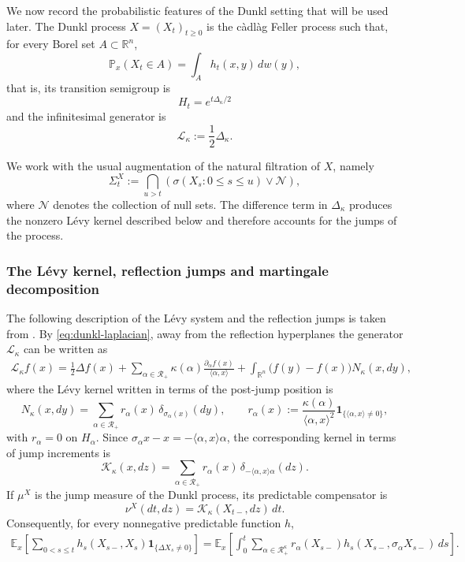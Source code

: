 \documentclass[11pt]{amsart}
\theoremstyle{definition}
\theoremstyle{remark}
\numberwithin{equation}{section}
\newcommand{\R}{\mathbb{R}}
\newcommand{\ind}{\mathbf{1}}
\newcommand{\RR}{\mathcal{R}}
\begin{document}
We now record the probabilistic features of the Dunkl setting that will
be used later. The Dunkl process $X=(X_t)_{t\geq0}$ is the c\`adl\`ag Feller process such that, for every Borel set $A\subset\R^n$,
\[
\mathbb P_x(X_t\in A)
=
\int_A h_t(x,y)\,dw(y),
\]
that is, its transition semigroup is
\[
H_t=e^{t\Delta_\kappa/2}
\]
and the infinitesimal generator is
\[
\mathcal L_\kappa:=\frac12\Delta_\kappa.
\]

We work with the usual augmentation of the natural filtration of $X$,
namely
\[
\Sigma_t^X
:=
\bigcap_{u>t}
\left(
\sigma(X_s:0\leq s\leq u)
\vee\mathcal N
\right),
\]
where $\mathcal N$ denotes the collection of null sets. The difference term
in $\Delta_\kappa$ produces the nonzero L\'evy kernel described below
and therefore accounts for the jumps of the process.

\subsubsection{The L\'evy kernel, reflection jumps and martingale decomposition}

The following description of the L\'evy system and the reflection jumps
is taken from \cite{GallardoYor2006_Chaotic}. By \eqref{eq:dunkl-laplacian}, away from the reflection hyperplanes the
generator $\mathcal L_\kappa$ can be written as
\begin{align}
\mathcal L_\kappa f(x)
=
\frac12\Delta f(x)
+
\sum_{\alpha\in\RR_+}
\kappa(\alpha)
\frac{\partial_\alpha f(x)}{\langle\alpha,x\rangle}
+
\int_{\R^n}
\bigl(f(y)-f(x)\bigr)N_\kappa(x,dy),
\end{align}
where the L\'evy kernel written in terms of the post-jump position is
\begin{equation*}
N_\kappa(x,dy)
=
\sum_{\alpha\in\RR_+}
r_\alpha(x)\,\delta_{\sigma_\alpha(x)}(dy),
\qquad
r_\alpha(x)
:=
\frac{\kappa(\alpha)}{\langle\alpha,x\rangle^2}
\ind_{\{\langle\alpha,x\rangle\neq0\}},
\end{equation*}
with $r_\alpha=0$ on $H_\alpha$.
Since
$\sigma_\alpha x-x=-\langle\alpha,x\rangle\alpha$,
the corresponding kernel in terms of jump increments is
\begin{equation*}
\mathcal K_\kappa(x,dz)
=
\sum_{\alpha\in\RR_+}
r_\alpha(x)\,\delta_{-\langle\alpha,x\rangle\alpha}(dz).
\end{equation*}
If $\mu^X$ is the jump measure of the Dunkl process, its predictable
compensator is
\begin{equation*}
\nu^X(dt,dz)
=
\mathcal K_\kappa(X_{t-},dz)\,dt.
\end{equation*}
Consequently, for every nonnegative predictable function $h$,
\begin{equation}
\begin{split}
\mathbb E_x\left[
\sum_{0<s\leq t}
h_s(X_{s-},X_s)\ind_{\{\Delta X_s\neq0\}}
\right]
=
\mathbb E_x\left[
\int_0^t
\sum_{\alpha\in\RR_+^\kappa}
r_\alpha(X_{s-})h_s(X_{s-},\sigma_\alpha X_{s-})\,ds
\right].
\end{split}
\label{compensation formula}
\end{equation}
\end{document}
